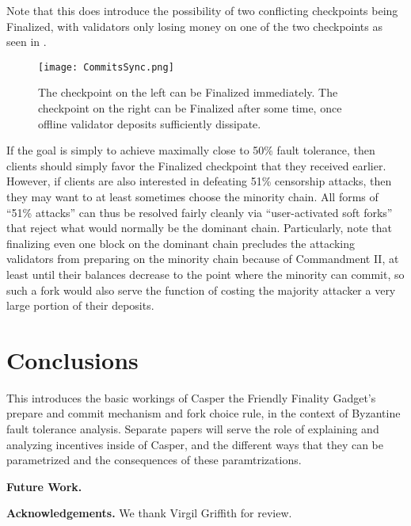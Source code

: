 \documentclass[12pt]{article}
\begin{document}
Note that this does introduce the possibility of two conflicting checkpoints being Finalized, with validators only losing money on one of the two checkpoints as seen in .

\begin{figure}[h!tb]
\centering
\texttt{[image: CommitsSync.png]}
\caption{The checkpoint on the left can be Finalized immediately. The checkpoint on the right can be Finalized after some time, once offline validator deposits sufficiently dissipate.}
\label{fig:commitsync}
\end{figure}

If the goal is simply to achieve maximally close to 50\% fault tolerance, then clients should simply favor the Finalized checkpoint that they received earlier. However, if clients are also interested in defeating 51\% censorship attacks, then they may want to at least sometimes choose the minority chain. All forms of ``51\% attacks'' can thus be resolved fairly cleanly via ``user-activated soft forks'' that reject what would normally be the dominant chain. Particularly, note that finalizing even one block on the dominant chain precludes the attacking validators from preparing on the minority chain because of Commandment II, at least until their balances decrease to the point where the minority can commit, so such a fork would also serve the function of costing the majority attacker a very large portion of their deposits.

\section{Conclusions}

This introduces the basic workings of Casper the Friendly Finality Gadget's prepare and commit mechanism and fork choice rule, in the context of Byzantine fault tolerance analysis. Separate papers will serve the role of explaining and analyzing incentives inside of Casper, and the different ways that they can be parametrized and the consequences of these paramtrizations.

\textbf{Future Work.} 

\textbf{Acknowledgements.} We thank Virgil Griffith for review.



%
%



\end{document}
